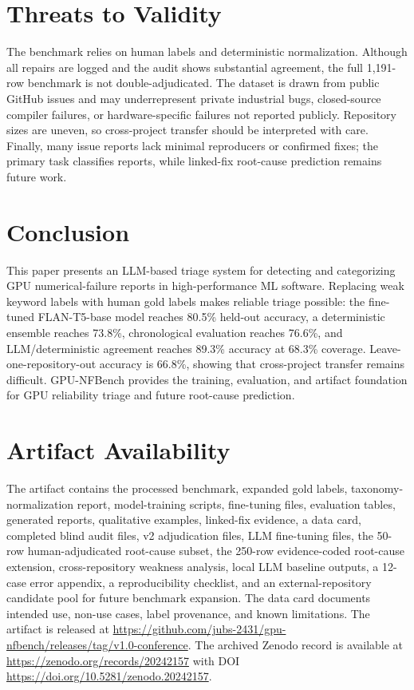 \documentclass[conference]{IEEEtran}
\newcommand{\bench}{GPU-NFBench}
\begin{document}
\section{Threats to Validity}

The benchmark relies on human labels and deterministic normalization. Although
all repairs are logged and the audit shows substantial agreement, the full
1,191-row benchmark is not double-adjudicated. The dataset is drawn from public
GitHub issues and may underrepresent private industrial bugs, closed-source
compiler failures, or hardware-specific failures not reported publicly.
Repository sizes are uneven, so cross-project transfer should be interpreted
with care. Finally, many issue reports lack minimal reproducers or confirmed
fixes; the primary task classifies reports, while linked-fix root-cause
prediction remains future work.

\section{Conclusion}

This paper presents an LLM-based triage system for detecting and categorizing
GPU numerical-failure reports in high-performance ML software. Replacing weak
keyword labels with human gold labels makes reliable triage possible: the
fine-tuned FLAN-T5-base model reaches 80.5\% held-out accuracy, a deterministic
ensemble reaches 73.8\%, chronological evaluation reaches 76.6\%, and
LLM/deterministic agreement reaches 89.3\% accuracy at 68.3\% coverage.
Leave-one-repository-out accuracy is 66.8\%, showing that cross-project
transfer remains difficult. \bench{} provides the training, evaluation, and
artifact foundation for GPU reliability triage and future root-cause
prediction.

\section*{Artifact Availability}

The artifact contains the processed benchmark, expanded gold labels,
taxonomy-normalization report, model-training scripts, fine-tuning files,
evaluation tables, generated reports, qualitative examples, linked-fix evidence,
a data card, completed blind audit files, v2 adjudication files, LLM fine-tuning
files, the 50-row human-adjudicated root-cause subset, the 250-row
evidence-coded root-cause extension, cross-repository weakness analysis, local
LLM baseline outputs, a 12-case error appendix, a reproducibility checklist,
and an external-repository candidate pool for future benchmark expansion. The
data card documents intended use, non-use cases, label provenance, and known
limitations. The artifact is released at
\url{https://github.com/jubs-2431/gpu-nfbench/releases/tag/v1.0-conference}.
The archived Zenodo record is available at
\url{https://zenodo.org/records/20242157} with DOI
\url{https://doi.org/10.5281/zenodo.20242157}.
\end{document}
